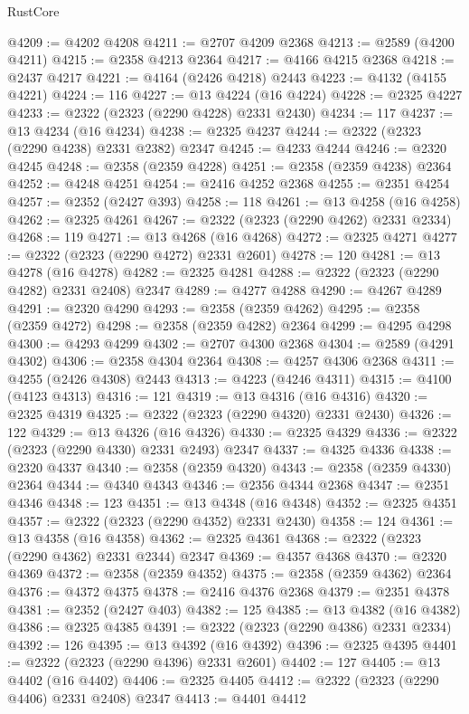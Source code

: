 \begin{lexlean}{RustCore}
\begin{coremodule}
@4209 := @4202 @4208
@4211 := @2707 @4209 @2368
@4213 := @2589 (@4200 @4211)
@4215 := @2358 @4213 @2364
@4217 := @4166 @4215 @2368
@4218 := @2437 @4217
@4221 := @4164 (@2426 @4218) @2443
@4223 := @4132 (@4155 @4221)
@4224 := 116
@4227 := @13 @4224 (@16 @4224)
@4228 := @2325 @4227
@4233 := @2322 (@2323 (@2290 @4228) @2331 @2430)
@4234 := 117
@4237 := @13 @4234 (@16 @4234)
@4238 := @2325 @4237
@4244 := @2322 (@2323 (@2290 @4238) @2331 @2382) @2347
@4245 := @4233 @4244
@4246 := @2320 @4245
@4248 := @2358 (@2359 @4228)
@4251 := @2358 (@2359 @4238) @2364
@4252 := @4248 @4251
@4254 := @2416 @4252 @2368
@4255 := @2351 @4254
@4257 := @2352 (@2427 @393)
@4258 := 118
@4261 := @13 @4258 (@16 @4258)
@4262 := @2325 @4261
@4267 := @2322 (@2323 (@2290 @4262) @2331 @2334)
@4268 := 119
@4271 := @13 @4268 (@16 @4268)
@4272 := @2325 @4271
@4277 := @2322 (@2323 (@2290 @4272) @2331 @2601)
@4278 := 120
@4281 := @13 @4278 (@16 @4278)
@4282 := @2325 @4281
@4288 := @2322 (@2323 (@2290 @4282) @2331 @2408) @2347
@4289 := @4277 @4288
@4290 := @4267 @4289
@4291 := @2320 @4290
@4293 := @2358 (@2359 @4262)
@4295 := @2358 (@2359 @4272)
@4298 := @2358 (@2359 @4282) @2364
@4299 := @4295 @4298
@4300 := @4293 @4299
@4302 := @2707 @4300 @2368
@4304 := @2589 (@4291 @4302)
@4306 := @2358 @4304 @2364
@4308 := @4257 @4306 @2368
@4311 := @4255 (@2426 @4308) @2443
@4313 := @4223 (@4246 @4311)
@4315 := @4100 (@4123 @4313)
@4316 := 121
@4319 := @13 @4316 (@16 @4316)
@4320 := @2325 @4319
@4325 := @2322 (@2323 (@2290 @4320) @2331 @2430)
@4326 := 122
@4329 := @13 @4326 (@16 @4326)
@4330 := @2325 @4329
@4336 := @2322 (@2323 (@2290 @4330) @2331 @2493) @2347
@4337 := @4325 @4336
@4338 := @2320 @4337
@4340 := @2358 (@2359 @4320)
@4343 := @2358 (@2359 @4330) @2364
@4344 := @4340 @4343
@4346 := @2356 @4344 @2368
@4347 := @2351 @4346
@4348 := 123
@4351 := @13 @4348 (@16 @4348)
@4352 := @2325 @4351
@4357 := @2322 (@2323 (@2290 @4352) @2331 @2430)
@4358 := 124
@4361 := @13 @4358 (@16 @4358)
@4362 := @2325 @4361
@4368 := @2322 (@2323 (@2290 @4362) @2331 @2344) @2347
@4369 := @4357 @4368
@4370 := @2320 @4369
@4372 := @2358 (@2359 @4352)
@4375 := @2358 (@2359 @4362) @2364
@4376 := @4372 @4375
@4378 := @2416 @4376 @2368
@4379 := @2351 @4378
@4381 := @2352 (@2427 @403)
@4382 := 125
@4385 := @13 @4382 (@16 @4382)
@4386 := @2325 @4385
@4391 := @2322 (@2323 (@2290 @4386) @2331 @2334)
@4392 := 126
@4395 := @13 @4392 (@16 @4392)
@4396 := @2325 @4395
@4401 := @2322 (@2323 (@2290 @4396) @2331 @2601)
@4402 := 127
@4405 := @13 @4402 (@16 @4402)
@4406 := @2325 @4405
@4412 := @2322 (@2323 (@2290 @4406) @2331 @2408) @2347
@4413 := @4401 @4412

\end{coremodule}
\end{lexlean}
